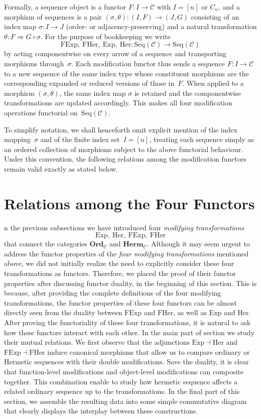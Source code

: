 \documentclass[11pt]{book}
\theoremstyle{definition}
\theoremstyle{plain}
\theoremstyle{remark}
\begin{document}
Formally, a sequence object is a functor $F:I\to\mathcal C$
with $I=[n]$ or $C_n$, and a morphism of sequences is a pair
$(\sigma,\theta):(I,F)\to(J,G)$ consisting of an index map
$\sigma:I\to J$ (order- or adjacency-preserving)
and a natural transformation $\theta:F\Rightarrow G\circ\sigma$.
For the purpose of bookkeeping we write
\[
\mathrm{FExp},\ \mathrm{FHer},\ \mathrm{Exp},\ \mathrm{Her}
:\mathrm{Seq}(\mathcal C)\longrightarrow\mathrm{Seq}(\mathcal C)
\]
by acting componentwise on every arrow of a sequence
and transporting morphisms through~$\sigma$.
Each modification functor thus sends a sequence
$F:I\to\mathcal C$ to a new sequence of the same index type
whose constituent morphisms are the corresponding expanded
or reduced versions of those in~$F$.
When applied to a morphism $(\sigma,\theta)$,
the same index map $\sigma$ is retained and the componentwise
transformations are updated accordingly.
This makes all four modification operations functorial on~$\mathrm{Seq}(\mathcal C)$.

To simplify notation, we shall henceforth omit explicit mention
of the index mapping~$\sigma$ and of the finite index set~$I=[n]$,
treating each sequence simply as an ordered collection of morphisms
subject to the above functorial behaviour.
Under this convention, the following relations among
the modification functors remain valid exactly as stated below.


\section{Relations among the Four Functors}
n the previous subsections we have introduced four \emph{modifying transformations}
\[
\mathrm{Exp},\ \mathrm{Her},\ \mathrm{FExp},\ \mathrm{FHer}
\]
that connect the categories $\mathbf{Ord}_{\mathcal C}$ and $\mathbf{Herm}_{\mathcal C}$.
Although it may seem urgent to address the functor properties of the \emph{four modifying transformations} mentioned above, we did not 
initially realize the need to explicitly consider these four transformations as functors. Therefore, we placed the proof of their functor properties after 
discussing functor duality, in the beginning of this section. This is because, after providing the complete definitions of the four modifying transformations, the functor properties of these four 
functors can be almost directly seen from the duality between \(\mathrm{FExp}\) and \(\mathrm{FHer}\), as well as \(\mathrm{Exp}\) and \(\mathrm{Her}\).
After proving the functoriality of these four transformations, it is natural to ask how these functors interact with each other.
In the main part of section we study their mutual relations.
We first observe that the adjunctions $\mathrm{Exp}\dashv \mathrm{Her}$ 
and $\mathrm{FExp}\dashv \mathrm{FHer}$ induce canonical morphisms 
that allow us to compare ordinary or Hermetic sequences 
with their double modifications. 
Save the duality, it is clear that function-level modifications and object-level modifications can composite together.
This combination enable to study how hermetic sequence affects a related ordinary sequence up to the transformations.
In the final part of this section, we assemble the resulting data into some simple commutative diagram that clearly displays the interplay between these constructions. 
\end{document}
